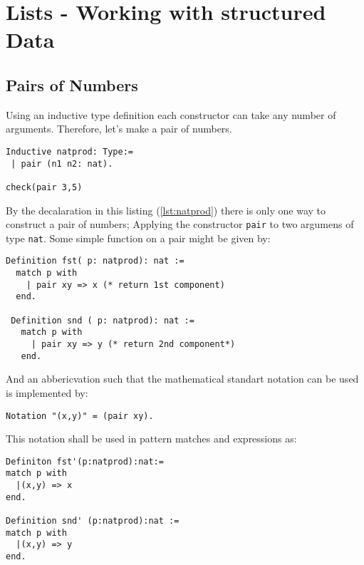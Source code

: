 \section{Lists - Working with structured Data}

\subsection{Pairs of Numbers}

Using an inductive type definition each constructor can take any number of arguments. 
Therefore, let's make a pair of numbers.

\begin{lstlisting}[caption = \lstinline!natprod!, label = lst:natprod]
Inductive natprod: Type:=
 | pair (n1 n2: nat).

check(pair 3,5)
\end{lstlisting}
By the decalaration in this listing (\ref{lst:natprod}) there is only one way to construct a pair of numbers; 
Applying the constructor \lstinline!pair! to two argumens of type \lstinline!nat!.
Some simple function on a pair might be given by: 
\begin{lstlisting}[caption = \lstinline!fst!, label = lst:fst]
Definition fst( p: natprod): nat :=
  match p with 
    | pair xy => x (* return 1st component)
  end.
 
 Definition snd ( p: natprod): nat :=
   match p with 
     | pair xy => y (* return 2nd component*)
   end.
\end{lstlisting}

And an abbericvation such that the mathematical standart notation can be used is implemented by:
\begin{lstlisting}[caption=\lstinline!pair!-naotation, label = lst:pairNotation]
Notation "(x,y)" = (pair xy).
\end{lstlisting}

This notation shall be used in pattern matches and expressions as: 
\begin{lstlisting}[caption = \lstinline!fst'! and \lstinline!snd'!, label =lst:newNotation ]
Definiton fst'(p:natprod):nat:=
match p with
  |(x,y) => x
end.

Definition snd' (p:natprod):nat :=
match p with
  |(x,y) => y
end.
\end{lstlisting}




